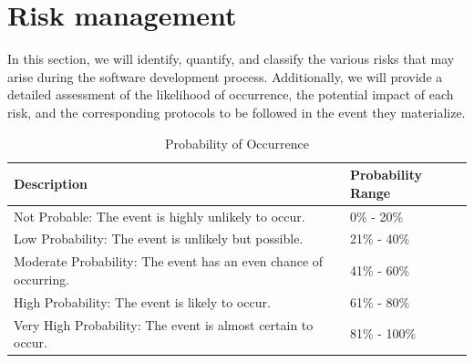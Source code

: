 \documentclass{scrreprt}
\begin{document}
\section{Risk management}
In this section, we will identify, quantify, and classify the various risks that may arise during the software development process. Additionally, we will provide a detailed assessment of the likelihood of occurrence, the potential impact of each risk, and the corresponding protocols to be followed in the event they materialize.

\begin{table}[h!]
	\centering \small
	\renewcommand{\arraystretch}{1.5} 
	\begin{tabular}{|p{10cm}|p{5cm}|} 
		\hline
		\textbf{Description} & \textbf{Probability Range} \\ \hline
		Not Probable: The event is highly unlikely to occur. & 0\% - 20\% \\ \hline
		Low Probability: The event is unlikely but possible. & 21\% - 40\% \\ \hline
		Moderate Probability: The event has an even chance of occurring. & 41\% - 60\% \\ \hline
		High Probability: The event is likely to occur. & 61\% - 80\% \\ \hline
		Very High Probability: The event is almost certain to occur. & 81\% - 100\% \\ \hline
	\end{tabular}
	\caption{Probability of Occurrence}
\end{table} \FloatBarrier

\end{document}

